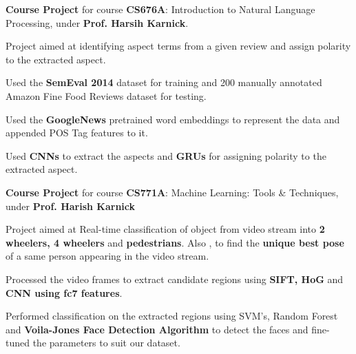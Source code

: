 \documentclass[a4paper]{norm-resume}
\begin{document}
					
	\begin{tightitemize}
	\small
	{
	\item \textbf{Course Project} for course \textbf{CS676A}: Introduction to Natural Language Processing, under \textbf{Prof. Harsih Karnick}.
    \item Project aimed at identifying aspect terms from a given review and assign polarity to the extracted aspect.
    \item Used the \textbf{SemEval 2014} dataset for training and 200 manually annotated Amazon Fine Food Reviews dataset for testing.
    \item Used the \textbf{GoogleNews} pretrained word embeddings to represent the data and appended POS Tag features to it.
    \item Used \textbf{CNNs} to extract the aspects and \textbf{GRUs} for assigning polarity to the extracted aspect.
	}
	\end{tightitemize}
		
	\vspace{2mm}
	
				\descript{Jan '16 - Apr '16}	
	\begin{tightitemize}
	\small
	{
	\item \textbf{Course Project} for course \textbf{CS771A}: Machine Learning: Tools \& Techniques, under \textbf{Prof. Harish Karnick}
	\item Project aimed at Real-time classification of object from video stream into \textbf{2 wheelers, 4 wheelers} and \textbf{pedestrians}. Also , to
    find the \textbf{unique best pose} of a same person appearing in the video stream.
    \item Processed the video frames to extract candidate regions using \textbf{SIFT, HoG }and \textbf{CNN using fc7 features}.
    \item Performed classification on the extracted regions using SVM’s, Random Forest and \textbf{Voila-Jones Face Detection Algorithm} to
    detect the faces and fine-tuned the parameters to suit our dataset.
    }
	\end{tightitemize}
		
	\vspace{2mm}
\end{document}
